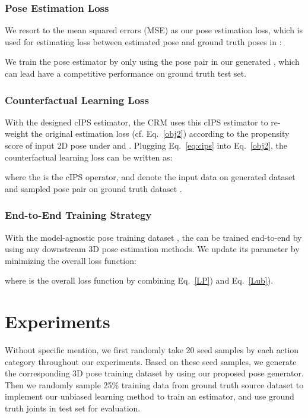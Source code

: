 \documentclass[runningheads]{llncs}
\begin{document}
\subsubsection{Pose Estimation Loss} We resort to the mean squared errors (MSE) as our pose estimation loss, which is used for estimating loss between estimated pose  and ground truth poses  in :



We train the pose estimator  by only using the pose pair  in our generated , which can lead  have a competitive performance on ground truth test set. 

\subsubsection{Counterfactual Learning Loss} 
With the designed cIPS estimator, the CRM uses this cIPS estimator to re-weight the original estimation loss (cf. Eq.~\eqref{obj2}) according to the propensity score of input 2D pose  under  and . 
Plugging Eq.~\eqref{eq:cips} into Eq.~\eqref{obj2}, the counterfactual learning loss can be written as:

where the  is the cIPS operator,  and  denote the input data on generated dataset  and sampled pose pair on ground truth dataset . 

\subsubsection{End-to-End Training Strategy} With the model-agnostic pose training dataset , the  can be trained end-to-end by using any downstream 3D pose estimation methods. We update its parameter by minimizing the overall loss function:


where  is the overall loss function by combining Eq.~\eqref{LP}) and Eq.~\eqref{Lub}).

\section{Experiments}
Without specific mention, we first randomly take 20 seed samples by each action category throughout our experiments. 
Based on these seed samples, we generate the corresponding 3D pose training dataset by using our proposed pose generator. 
Then we randomly sample 25\% training data from ground truth source dataset to implement our unbiased learning method to train an estimator, and use ground truth joints in test set for evaluation. 
\end{document}
